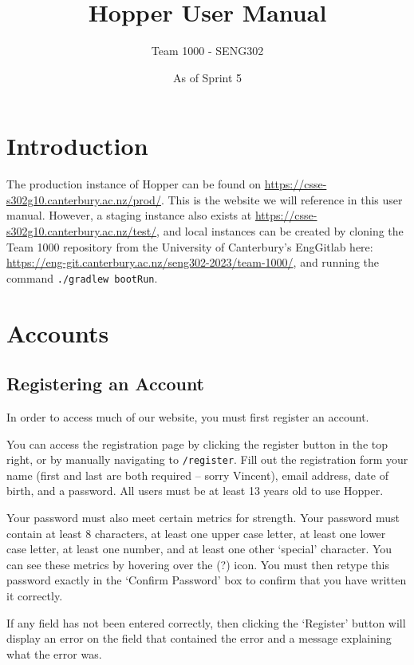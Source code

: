 \documentclass{article}
\title{Hopper User Manual}
\author{Team 1000 - SENG302}
\date{As of Sprint 5}
\begin{document}
    \maketitle

    \tableofcontents

    \section{Introduction}

    The production instance of Hopper can be found on \url{https://csse-s302g10.canterbury.ac.nz/prod/}. This is the website we will reference in this user manual. However, a staging instance also exists at \url{https://csse-s302g10.canterbury.ac.nz/test/}, and local instances can be created by cloning the Team 1000 repository from the University of Canterbury's EngGitlab here: \url{https://eng-git.canterbury.ac.nz/seng302-2023/team-1000/}, and running the command \texttt{./gradlew bootRun}.

    \section{Accounts}

    \subsection{Registering an Account}

    In order to access much of our website, you must first register an account.

    You can access the registration page by clicking the register button in the top right, or by manually navigating to \texttt{/register}. Fill out the registration form your name (first and last are both required -- sorry Vincent), email address, date of birth, and a password. All users must be at least 13 years old to use Hopper.

    Your password must also meet certain metrics for strength. Your password must contain at least 8 characters, at least one upper case letter, at least one lower case letter, at least one number, and at least one other `special' character. You can see these metrics by hovering over the (?) icon. You must then retype this password exactly in the `Confirm Password' box to confirm that you have written it correctly.

    If any field has not been entered correctly, then clicking the `Register' button will display an error on the field that contained the error and a message explaining what the error was.
\end{document}
